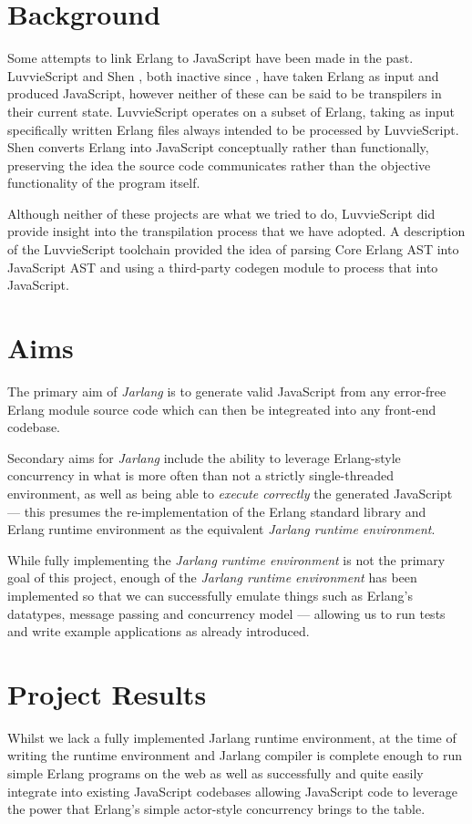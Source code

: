\documentclass[twoside,12pt,titlepage,a4paper]{article}
\begin{document}
\section{Background}
\label{Background}

Some attempts to link Erlang to JavaScript have been made in the past. LuvvieScript \citep{luvvieGitHub} and Shen \citep{ShenGitHub}, both inactive since \citeyear{ShenGitHub}, have taken Erlang as input and produced JavaScript, however neither of these can be said to be transpilers in their current state. LuvvieScript operates on a subset of Erlang, taking as input specifically written Erlang files always intended to be processed by LuvvieScript. Shen converts Erlang into JavaScript conceptually rather than functionally, preserving the idea the source code communicates rather than the objective functionality of the program itself.

Although neither of these projects are what we tried to do, LuvvieScript did provide insight into the transpilation process that we have adopted. A description of the LuvvieScript toolchain \citep{luvvieWebWayBack} provided the idea of parsing Core Erlang AST into JavaScript AST and using a third-party codegen module to process that into JavaScript.

\section{Aims}
\label{Aims}
The primary aim of \textit{Jarlang} is to generate valid JavaScript from any error-free Erlang module source code which can then be integreated into any front-end codebase.

Secondary aims for \textit{Jarlang} include the ability to leverage Erlang-style concurrency in what is more often than not a strictly single-threaded environment, as well as being able to \textit{execute correctly} the generated JavaScript --- this presumes the re-implementation of the Erlang standard library and Erlang runtime environment as the equivalent \textit{Jarlang runtime environment}.

While fully implementing the \textit{Jarlang runtime environment} is not the primary goal of this project, enough of the \textit{Jarlang runtime environment} has been implemented so that we can successfully emulate things such as Erlang's datatypes, message passing and concurrency model --- allowing us to run tests and write example applications as already introduced.

\section{Project Results}
\label{Results}
Whilst we lack a fully implemented Jarlang runtime environment, at the time of writing the runtime environment and Jarlang compiler is complete enough to run simple Erlang programs on the web as well as successfully and quite easily integrate into existing JavaScript codebases allowing JavaScript code to leverage the power that Erlang's simple actor-style concurrency brings to the table.
\end{document}
